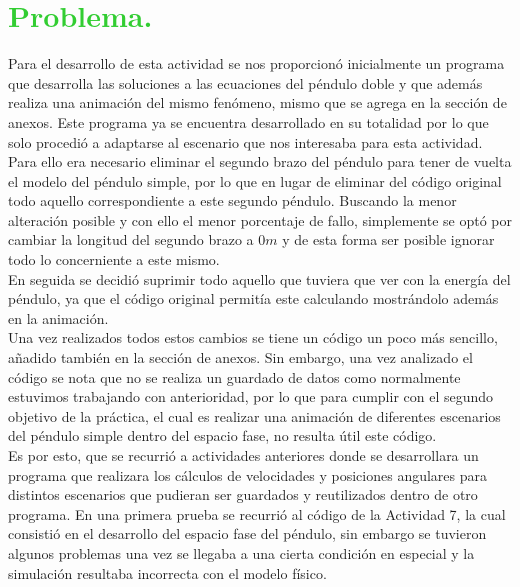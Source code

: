 \documentclass[12pt]{article}
\begin{document}
\pagebreak
\section*{\textcolor{LimeGreen}{Problema.}}

Para el desarrollo de esta actividad se nos proporcionó inicialmente un programa que desarrolla las soluciones a las ecuaciones del péndulo doble y que además realiza una animación del mismo fenómeno, mismo que se agrega en la sección de anexos. Este programa ya se encuentra desarrollado en su totalidad por lo que solo procedió a adaptarse al escenario que nos interesaba para esta actividad.\\

Para ello era necesario eliminar el segundo brazo del péndulo para tener de vuelta el modelo del péndulo simple, por lo que en lugar de eliminar del código original todo aquello correspondiente a este segundo péndulo. Buscando la menor alteración posible y con ello el menor porcentaje de fallo, simplemente se optó por cambiar la longitud del segundo brazo a $0 m$ y de esta forma ser posible ignorar todo lo concerniente a este mismo.\\

En seguida se decidió suprimir todo aquello que tuviera que ver con la energía del péndulo, ya que el código original permitía este calculando mostrándolo además en la animación.\\

Una vez realizados todos estos cambios se tiene un código un poco más sencillo, añadido también en la sección de anexos. Sin embargo, una vez analizado el código se nota que no se realiza un guardado de datos como normalmente estuvimos trabajando con anterioridad, por lo que para cumplir con el segundo objetivo de la práctica, el cual es realizar una animación de diferentes escenarios del péndulo simple dentro del espacio fase, no resulta útil este código.\\

Es por esto, que se recurrió a actividades anteriores donde se desarrollara un programa que realizara los cálculos de velocidades y posiciones angulares para distintos escenarios que pudieran ser guardados y reutilizados dentro de otro programa. En una primera prueba se recurrió al código de la Actividad 7, la cual consistió en el desarrollo del espacio fase del péndulo, sin embargo se tuvieron algunos problemas una vez se llegaba a una cierta condición en especial y la simulación resultaba incorrecta con el modelo físico.\\
\end{document}
